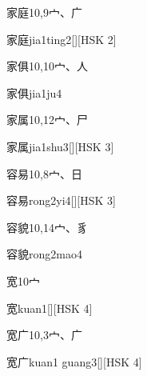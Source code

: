 \begin{entry}{家庭}{10,9}{⼧、⼴}
  \begin{phonetics}{家庭}{jia1ting2}[][HSK 2]
  \end{phonetics}
\end{entry}

\begin{entry}{家俱}{10,10}{⼧、⼈}
  \begin{phonetics}{家俱}{jia1ju4}
  \end{phonetics}
\end{entry}

\begin{entry}{家属}{10,12}{⼧、⼫}
  \begin{phonetics}{家属}{jia1shu3}[][HSK 3]
  \end{phonetics}
\end{entry}

\begin{entry}{容易}{10,8}{⼧、⽇}
  \begin{phonetics}{容易}{rong2yi4}[][HSK 3]
  \end{phonetics}
\end{entry}

\begin{entry}{容貌}{10,14}{⼧、⾘}
  \begin{phonetics}{容貌}{rong2mao4}
  \end{phonetics}
\end{entry}

\begin{entry}{宽}{10}{⼧}
  \begin{phonetics}{宽}{kuan1}[][HSK 4]
  \end{phonetics}
\end{entry}

\begin{entry}{宽广}{10,3}{⼧、⼴}
  \begin{phonetics}{宽广}{kuan1 guang3}[][HSK 4]
  \end{phonetics}
\end{entry}

